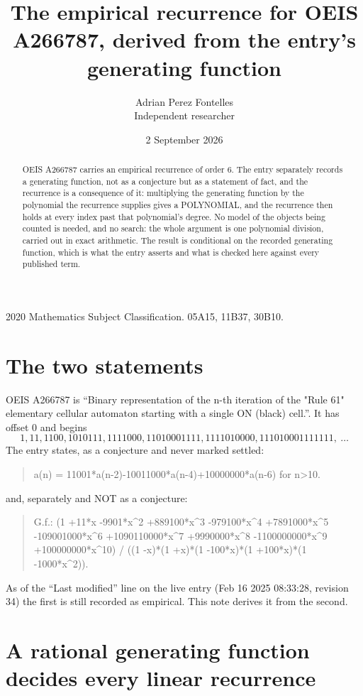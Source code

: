 \documentclass[11pt,a4paper]{article}
\title{The empirical recurrence for OEIS A266787, derived from the entry's generating function}
\author{Adrian Perez Fontelles\\ \small Independent researcher}
\date{2 September 2026}
\theoremstyle{plain}
\theoremstyle{definition}
\begin{document}
\maketitle

\begin{abstract}
OEIS A266787 carries an empirical recurrence of order $6$. The entry separately records a
generating function, not as a conjecture but as a statement of fact, and the recurrence is a
consequence of it: multiplying the generating function by the polynomial the recurrence
supplies gives a POLYNOMIAL, and the recurrence then holds at every index past that
polynomial's degree. No model of the objects being counted is needed, and no search: the
whole argument is one polynomial division, carried out in exact arithmetic. The result is
conditional on the recorded generating function, which is what the entry asserts and what is
checked here against every published term.
\end{abstract}

\noindent\small 2020 Mathematics Subject Classification. 05A15, 11B37, 30B10.\normalsize

\section{The two statements}

OEIS A266787 is ``Binary representation of the n-th iteration of the "Rule 61" elementary cellular automaton starting with a single ON (black) cell.''. It has offset $0$ and begins
\[
1, 11, 1100, 1010111, 1111000, 11010001111, 1111010000, 111010001111111,\ \dots
\]
The entry states, as a conjecture and never marked settled:
\begin{quote}
a(n) = 11001*a(n-2)-10011000*a(n-4)+10000000*a(n-6) for n>10.
\end{quote}
and, separately and NOT as a conjecture:
\begin{quote}
G.f.: (1 +11*x -9901*x\^{}2 +889100*x\^{}3 -979100*x\^{}4 +7891000*x\^{}5 -109001000*x\^{}6 +1090110000*x\^{}7 +9990000*x\^{}8 -1100000000*x\^{}9 +100000000*x\^{}10) / ((1 -x)*(1 +x)*(1 -100*x)*(1 +100*x)*(1 -1000*x\^{}2)).
\end{quote}
As of the ``Last modified'' line on the live entry (Feb 16 2025 08:33:28, revision 34) the first is still
recorded as empirical. This note derives it from the second.

\section{A rational generating function decides every linear recurrence}
\end{document}
